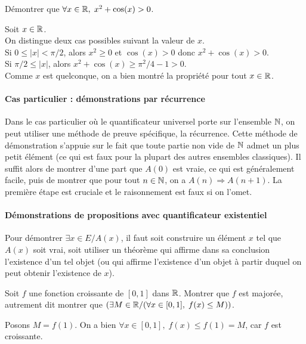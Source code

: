 {\begin{exemple}
Démontrer que $\forall x\in\mathbb{R},\; x^2+\cos(x)>0$.
\end{exemple}
\begin{red}
Soit $x\in\mathbb{R}$.\\
On distingue deux cas possibles suivant la valeur de $x$.\\
Si $0\leq |x|< \pi/2$, alors $x^2\geq 0$ et $\cos(x)> 0$ donc $x^2+\cos(x)>0$.\\
Si  $\pi/2\leq|x|$, alors $x^2+\cos(x)\geq \pi^2/4-1>0$.\\
Comme $x$ est quelconque, on a bien montré la propriété pour tout $x\in\mathbb{R}$.\end{red}

\paragraph{Cas particulier : démonstrations par récurrence}

Dans le cas particulier où le quantificateur universel porte sur l'ensemble $\mathbb{N}$, on peut utiliser une méthode de preuve spécifique, la récurrence. Cette méthode de démonstration s'appuie sur le fait que toute partie non vide de $\mathbb{N}$ admet un plus petit élément (ce qui est faux pour la plupart des autres ensembles classiques). Il suffit alors de montrer d'une part que $A(0)$ est vraie, ce qui est généralement facile, puis de montrer que pour tout $n \in\mathbb{N}$, on a $A(n) \Rightarrow A(n+1)$. La première étape est cruciale et le raisonnement est faux si on l'omet.


\paragraph{Démonstrations de propositions avec quantificateur existentiel}

Pour démontrer \og$\exists x\in E\slash A(x)$, il faut soit construire un élément $x$ tel que $A(x)$ soit vrai, soit utiliser un théorème qui affirme dans sa conclusion l'existence d'un tel objet (ou qui affirme l'existence d'un objet à partir duquel on peut obtenir l'existence de $x$).

\begin{exemple}
Soit $f$ une fonction croissante de $[0,1]$ dans $\mathbb{R}$. Montrer que $f$ est majorée, autrement dit montrer que $(\exists M\in\mathbb{R}\slash (\forall x\in[0,1],\;f(x)\leq M))$.
\begin{red}
Posons $M = f(1)$. On a bien $\forall x\in[0,1],\;f(x)\leq f(1)= M$, car $f$ est croissante.
\end{red}
\end{exemple}

}
